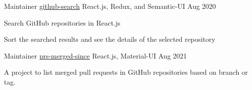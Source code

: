 

\begin{cventries}

  \cventry
    {Maintainer }
    {\href{https://github.com/lalitmee/github-search}{github-search}}
    {React.js, Redux, and Semantic-UI}
    {Aug 2020}
    {
      \begin{cvitems}
        \item {Search GitHub repositories in React.js}
        \item {Sort the searched results and see the details of the selected repository}
      \end{cvitems}
     }

  \cventry
    {Maintainer}
    {\href{https://github.com/lalitmee/prs-merged-since}{prs-merged-since}}
    {React.js, Material-UI}
    {Aug 2021}
    {
      \begin{cvitems}
        \item {A project to list merged pull requests in GitHub repositories based on branch or tag.}
      \end{cvitems}
     }





     
\end{cventries}
